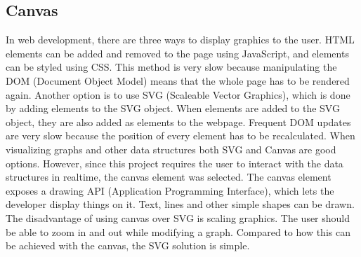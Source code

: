 \subsection{Canvas}
In web development, there are three ways to display graphics to the user. HTML elements can be added and removed to the page using JavaScript, and elements can be styled using CSS. This method is very slow because manipulating the DOM (Document Object Model) means that the whole page has to be rendered again. Another option is to use SVG (Scaleable Vector Graphics)\cite{SVG:Info}, which is done by adding elements to the SVG object. When elements are added to the SVG object, they are also added as elements to the webpage. Frequent DOM updates are very slow because the position of every element has to be recalculated. When visualizing graphs and other data structures both SVG and Canvas\cite{Canvas:Info} are good options. However, since this project requires the user to interact with the data structures in realtime, the canvas element was selected. The canvas element exposes a drawing API (Application Programming Interface), which lets the developer display things on it. Text, lines and other simple shapes can be drawn. The disadvantage of using canvas over SVG is scaling graphics. The user should be able to zoom in and out while modifying a graph. Compared to how this can be achieved with the canvas, the SVG solution is simple.